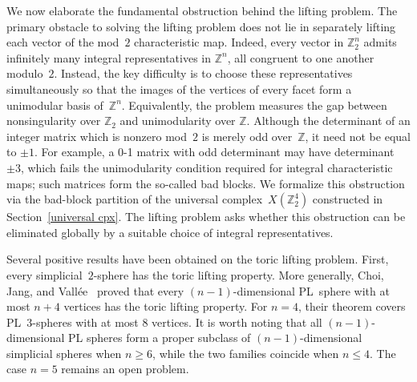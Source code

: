 \documentclass{amsart}
\newcommand{\Z}{\mathbb{Z}}
\theoremstyle{definition}
\theoremstyle{remark}
\begin{document}
We now elaborate the fundamental obstruction behind the lifting problem.
The primary obstacle to solving the lifting problem does not lie in separately lifting each vector of the mod~$2$ characteristic map.
Indeed, every vector in $\Z_2^n$ admits infinitely many integral representatives in $\Z^n$, all congruent to one another modulo~$2$.
Instead, the key difficulty is to choose these representatives simultaneously so that the images of the vertices of every facet form a unimodular basis of~$\Z^n$.
Equivalently, the problem measures the gap between nonsingularity over $\Z_2$ and unimodularity over $\Z$.
Although the determinant of an integer matrix which is nonzero mod~$2$ is merely odd over~$\Z$, it need not be equal to $\pm1$. 
For example, a 0-1 matrix with odd determinant may have determinant $\pm3$, which fails the unimodularity condition required for integral characteristic maps; such matrices form the so-called bad blocks. 
We formalize this obstruction via the bad-block partition of the universal complex~$X(\Z_2^4)$ constructed in Section~\ref{universal cpx}.
The lifting problem asks whether this obstruction can be  eliminated globally by a suitable choice of integral representatives. 

Several positive results have been obtained on the toric lifting problem. 
First, every simplicial~$2$-sphere has the toric lifting property.
More generally, Choi, Jang, and Vall\'ee~\cite{Choi-Jang-Vallee2025JLMS} proved that every $(n-1)$-dimensional PL~sphere with at most $n+4$ vertices has the toric lifting property. 
For $n=4$, their theorem covers PL~$3$-spheres with at most $8$ vertices.
It is worth noting that all $(n-1)$-dimensional PL spheres form a proper subclass of $(n-1)$-dimensional simplicial spheres when $n\geq 6$, while the two families coincide when $n\leq 4$.  
The case $n=5$ remains an open problem.
\end{document}
